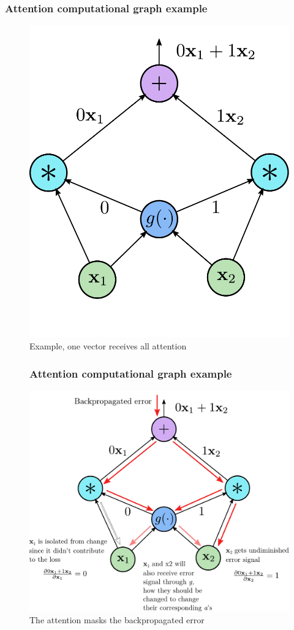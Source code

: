 \documentclass{beamer}
\begin{document}
\begin{frame}
      \frametitle{Attention computational graph example}
  \begin{figure}
    \includegraphics[scale=0.4]{attention_credit_assignment_ops_error}
        \caption{Example, one vector receives all attention}
      \end{figure}
\end{frame}
\begin{frame}

  \begin{figure}
        \frametitle{Attention computational graph example}
    \includegraphics[scale=0.4]{attention_credit_assignment_ops_example}
        \caption{The attention masks the backpropagated error}
      \end{figure}
\end{frame}
\end{document}
